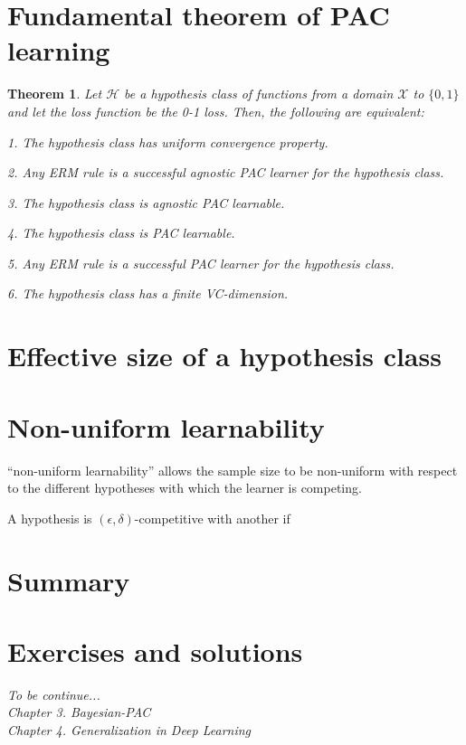 \documentclass{article}
\newtheorem{theorem}{Theorem}
\begin{document}
\section{Fundamental theorem of PAC learning}

	\begin{theorem}
	Let $\mathcal{H}$ be a hypothesis class of functions from a domain $\mathcal{X}$ to $\{0,1\}$ and let the loss function be the 0-1 loss. Then, the following are equivalent:
	
	1. The hypothesis class has uniform convergence property.
%
%
%

	2. Any ERM rule is a successful agnostic PAC learner for the hypothesis class.
	
	3. The hypothesis class is agnostic PAC learnable.


	4. The hypothesis class is PAC learnable.


	5. Any ERM rule is a successful PAC learner for the hypothesis class.
	
	6. The hypothesis class has a finite VC-dimension.
%
	\end{theorem}		
%
%
\section{Effective size of a hypothesis class}

\section{Non-uniform learnability}

“non-uniform learnability” allows the sample size to be non-uniform with respect to the different hypotheses with which the learner is competing. 

A hypothesis is $(\epsilon, \delta)$-competitive with another if
\section{Summary}
%


\section{Exercises and solutions}

\textit{
      To be continue...\\
      Chapter 3. Bayesian-PAC\\
      Chapter 4. Generalization in Deep Learning}
\end{document}

